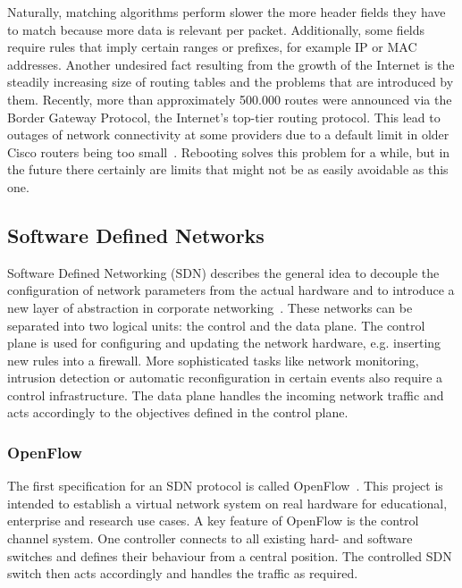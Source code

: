 \documentclass[a4paper,
		12pt,
		parskip=full,
		titlepage
		]{scrartcl}
\begin{document}
Naturally, matching algorithms perform slower the more header fields they 
have to match because more data is relevant per packet.
Additionally, some fields require rules that imply certain ranges or prefixes, for example IP or MAC addresses.
Another undesired fact resulting from the growth of the Internet is the 
steadily increasing size of routing tables and the problems that are introduced by them.
Recently, more than approximately 500.000 routes were announced via the Border Gateway Protocol, the Internet's top-tier routing protocol.
This lead to outages of network connectivity at some providers due to a default limit in older Cisco routers being too small~\cite{outage}.
Rebooting solves this problem for a while, but in the future there certainly are limits that might not be as easily avoidable as this one.

\subsection{Software Defined Networks}
\label{sec:SDN}
Software Defined Networking (SDN) describes the general idea to decouple 
the configuration of network parameters from the actual hardware and to 
introduce a new layer of abstraction in corporate networking~\cite{onf_whitepaper}.
These networks can be separated into two logical units: the control and the data plane.
The control plane is used for configuring and updating the network hardware, e.g. inserting new rules into a firewall.
More sophisticated tasks like network monitoring, intrusion detection or 
automatic reconfiguration in certain events also require a control infrastructure.
The data plane handles the incoming network traffic and acts accordingly to the objectives defined in the control plane.

\subsubsection{OpenFlow}
The first specification for an SDN protocol is called OpenFlow~\cite{openflow_spec10}.
This project is intended to establish a virtual network system on real hardware 
for educational, enterprise and research use cases.
A key feature of OpenFlow is the control channel system.
One controller connects to all existing hard- and software switches and defines their behaviour from a central position.
The controlled SDN switch then acts accordingly and handles the traffic as required.
\end{document}
